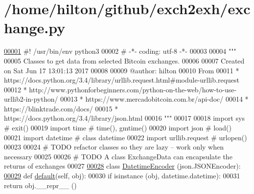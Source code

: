\hypertarget{exchange_8py_source}{}\section{/home/hilton/github/exch2exh/exchange.py}

\begin{DoxyCode}
\hypertarget{exchange_8py_source.tex_l00001}{}\hyperlink{namespaceexchange}{00001} \textcolor{comment}{#! /usr/bin/env python3 }
00002 \textcolor{comment}{# -*- coding: utf-8 -*-}
00003 
00004 \textcolor{stringliteral}{"""}
00005 \textcolor{stringliteral}{Classes to get data from selected Bitcoin exchanges.}
00006 \textcolor{stringliteral}{}
00007 \textcolor{stringliteral}{Created on Sat Jun 17 13:01:13 2017}
00008 \textcolor{stringliteral}{}
00009 \textcolor{stringliteral}{@author: hilton}
00010 \textcolor{stringliteral}{From }
00011 \textcolor{stringliteral}{* https://docs.python.org/3.4/library/urllib.request.html#module-urllib.request}
00012 \textcolor{stringliteral}{* http://www.pythonforbeginners.com/python-on-the-web/how-to-use-urllib2-in-python/}
00013 \textcolor{stringliteral}{* https://www.mercadobitcoin.com.br/api-doc/}
00014 \textcolor{stringliteral}{* https://blinktrade.com/docs/}
00015 \textcolor{stringliteral}{* https://docs.python.org/3.4/library/json.html}
00016 \textcolor{stringliteral}{"""}
00017 
00018 \textcolor{keyword}{import} sys            \textcolor{comment}{# exit()}
00019 \textcolor{keyword}{import} time           \textcolor{comment}{# time(), gmtime()}
00020 \textcolor{keyword}{import} json           \textcolor{comment}{# load()}
00021 \textcolor{keyword}{import} datetime       \textcolor{comment}{# class datetime}
00022 \textcolor{keyword}{import} urllib.request \textcolor{comment}{# urlopen()}
00023 
00024 \textcolor{comment}{# TODO refactor classes so they are lazy -- work only when necessary}
00025 
00026 \textcolor{comment}{# TODO A class ExchangeData can encapsulate the returns of exchanges}
00027 
\hypertarget{exchange_8py_source.tex_l00028}{}\hyperlink{classexchange_1_1_datetime_encoder}{00028} \textcolor{keyword}{class }\hyperlink{classexchange_1_1_datetime_encoder}{DatetimeEncoder} (json.JSONEncoder):
\hypertarget{exchange_8py_source.tex_l00029}{}\hyperlink{classexchange_1_1_datetime_encoder_a0bb4f94a13ce6c33e8d68869e282d24f}{00029}     \textcolor{keyword}{def }\hyperlink{classexchange_1_1_datetime_encoder_a0bb4f94a13ce6c33e8d68869e282d24f}{default}(self, obj):
00030         \textcolor{keywordflow}{if} isinstance (obj, datetime.datetime):
00031             \textcolor{keywordflow}{return} obj.\_\_repr\_\_ ()

\end{DoxyCode}
